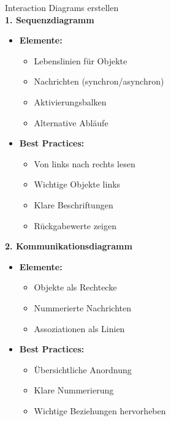 \begin{KR}{Interaction Diagrams erstellen}\\
\textbf{1. Sequenzdiagramm}
\begin{itemize}
    \item \textbf{Elemente:}
    \begin{itemize}
        \item Lebenslinien für Objekte
        \item Nachrichten (synchron/asynchron)
        \item Aktivierungsbalken
        \item Alternative Abläufe
    \end{itemize}
    
    \item \textbf{Best Practices:}
    \begin{itemize}
        \item Von links nach rechts lesen
        \item Wichtige Objekte links
        \item Klare Beschriftungen
        \item Rückgabewerte zeigen
    \end{itemize}
\end{itemize}

\textbf{2. Kommunikationsdiagramm}
\begin{itemize}
    \item \textbf{Elemente:}
    \begin{itemize}
        \item Objekte als Rechtecke
        \item Nummerierte Nachrichten
        \item Assoziationen als Linien
    \end{itemize}
    
    \item \textbf{Best Practices:}
    \begin{itemize}
        \item Übersichtliche Anordnung
        \item Klare Nummerierung
        \item Wichtige Beziehungen hervorheben
    \end{itemize}
\end{itemize}
\end{KR}

